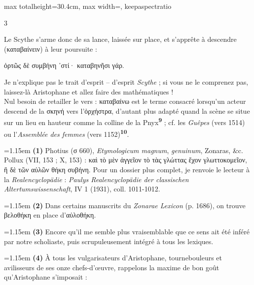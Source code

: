 \documentclass[11pt,twoside]{book}
\newcommand{\italique}[1]{\textit{#1}}
\newcommand{\citComm}[1]{\begin{quoting}[vskip=0.4pt,leftmargin=0.7em,rightmargin=0.2em]#1\end{quoting}}
\newcommand{\latin}[1]{\textit{#1}}
\newcommand{\allemand}[1]{\textit{#1}}
\newcommand{\marqueur}[1]{\textsuperscript{\color{rubricRed}\textbf{#1}}}
\begin{document}
\begin{adjustbox}{max totalheight=30.4cm, max width=\textwidth, keepaspectratio}
\begin{minipage}{\textwidth}
{\begin{multicols}{3}
\par\vspace{1.5pt}
\noindent Le Scythe s'arme donc de sa lance, laissée sur place, et s'apprête à descendre (καταβαίνειν) à leur poursuite :
\citComm{ὀρτῶς δὲ συμβήνη ᾽στί· καταβηνῆσι γάρ.}
\par\vspace{1.5pt}
\noindent Je n'explique pas le trait d'esprit -- d'esprit \italique{Scythe} ; si vous ne le comprenez pas, laissez-là Aristophane et allez faire des mathématiques !\\ Nul besoin de retailler le vers : καταβαίνω est le terme consacré lorsqu'un acteur descend de la σκηνή vers l'ὀρχήστρα, d'autant plus adapté quand la scène se situe sur un lieu en hauteur comme la colline de la Pnyx\marqueur{9} ; cf. les \italique{Guêpes} (vers 1514) ou l'\italique{Assemblée des femmes} (vers 1152)\marqueur{10}.
\par\vspace{1.5pt}
\par\vspace{1.2pt}\par\nopagebreak\vspace{1pt}\noindent\hangindent=1.15em {\color{sepiaNote}\textbf{(1)}} Photius (σ 660), \latin{Etymologicum magnum}, \latin{genuinum}, Zonaras, \&c. Pollux (VII, 153 ; X, 153) : καὶ τὸ μὲν ἀγγεῖον τὸ τὰς γλώττας ἔχον γλωττοκομεῖον, ἣ δὲ τῶν αὐλῶν θήκη συβήνη. Pour un dossier plus complet, je renvoie le lecteur à la \allemand{Realencyclopädie} : \italique{Paulys Realencyclopädie der classischen Altertumswissenschaft}, IV 1 (1931), coll. 1011-1012.
\par\vspace{1.5pt}
\noindent\hangindent=1.15em {\color{sepiaNote}\textbf{(2)}} Dans certains manuscrits du \italique{Zonarae Lexicon} (p. 1686), on trouve βελοθήκη en place d'αὐλοθήκη.
\par\vspace{1.5pt}
\noindent\hangindent=1.15em {\color{sepiaNote}\textbf{(3)}} Encore qu'il me semble plus vraisemblable que ce sens ait été inféré par notre scholiaste, puis scrupuleusement intégré à tous les lexiques.
\par\vspace{1.5pt}
\noindent\hangindent=1.15em {\color{sepiaNote}\textbf{(4)}} À tous les vulgarisateurs d'Aristophane, tournebouleurs et avilisseurs de ses onze chefs-d'œuvre, rappelons la maxime de bon goût qu'Aristophane s'imposait :

\end{multicols}}
\end{minipage}
\end{adjustbox}
\end{document}
